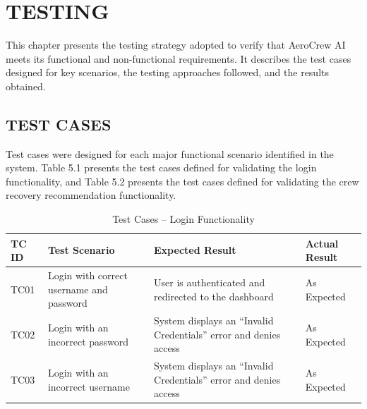 \documentclass[12pt,a4paper]{report}
\begin{document}

\chapter{TESTING}

This chapter presents the testing strategy adopted to verify that AeroCrew AI meets its functional and non-functional requirements. It describes the test cases designed for key scenarios, the testing approaches followed, and the results obtained.

\section{TEST CASES}

Test cases were designed for each major functional scenario identified in the system. Table 5.1 presents the test cases defined for validating the login functionality, and Table 5.2 presents the test cases defined for validating the crew recovery recommendation functionality.

\begin{table}[H]
\centering
\caption{Test Cases -- Login Functionality}
\begin{tabular}{|p{1.5cm}|p{5cm}|p{4cm}|p{4cm}|}
\hline
\textbf{TC ID} & \textbf{Test Scenario} & \textbf{Expected Result} & \textbf{Actual Result}\\
\hline

TC01 &
Login with correct username and password &
User is authenticated and redirected to the dashboard &
As Expected\\
\hline

TC02 &
Login with an incorrect password &
System displays an ``Invalid Credentials'' error and denies access &
As Expected\\
\hline

TC03 &
Login with an incorrect username &
System displays an ``Invalid Credentials'' error and denies access &
As Expected\\
\hline

\end{tabular}
\end{table}
\end{document}
